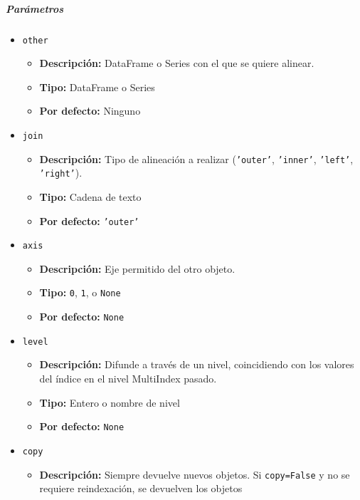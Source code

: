 \subparagraph{\textbf{Parámetros}}
\begin{itemize}
    \item \texttt{other}
          \begin{itemize}
              \item \textbf{Descripción:} DataFrame o Series con el que se
                    quiere alinear.
              \item \textbf{Tipo:} DataFrame o Series
              \item \textbf{Por defecto:} Ninguno
          \end{itemize}
    \item \texttt{join}
          \begin{itemize}
              \item \textbf{Descripción:} Tipo de alineación a realizar
                    (\texttt{'outer'}, \texttt{'inner'}, \texttt{'left'}, \texttt{'right'}).
              \item \textbf{Tipo:} Cadena de texto
              \item \textbf{Por defecto:} \texttt{'outer'}
          \end{itemize}
    \item \texttt{axis}
          \begin{itemize}
              \item \textbf{Descripción:} Eje permitido del otro objeto.
              \item \textbf{Tipo:} \texttt{0}, \texttt{1}, o \texttt{None}
              \item \textbf{Por defecto:} \texttt{None}
          \end{itemize}
    \item \texttt{level}
          \begin{itemize}
              \item \textbf{Descripción:} Difunde a través de un nivel,
                    coincidiendo con los valores del índice en el nivel MultiIndex pasado.
              \item \textbf{Tipo:} Entero o nombre de nivel
              \item \textbf{Por defecto:} \texttt{None}
          \end{itemize}
    \item \texttt{copy}
          \begin{itemize}
              \item \textbf{Descripción:} Siempre devuelve nuevos objetos. Si
                    \texttt{copy=False} y no se requiere reindexación, se devuelven los objetos

\end{itemize}
\end{itemize}
